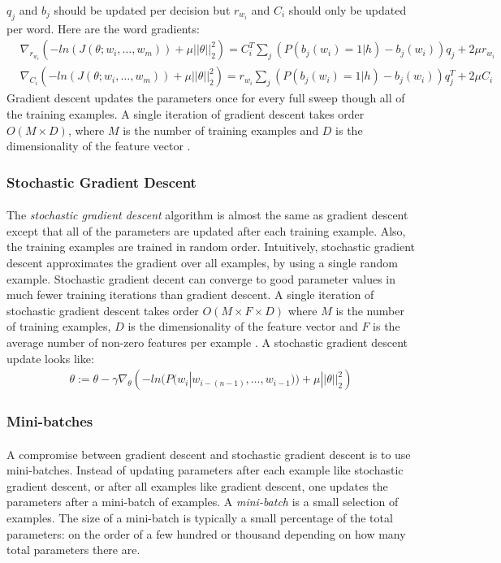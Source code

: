 $q_j$ and $b_j$ should be updated per decision but $r_{w_i}$ and $C_i$ should only be updated per word. Here are the word gradients:
\begin{align}
& \nabla_{r_{w_i}} \left( -ln(J(\theta;w_i,\dots, w_m)) +  \mu ||\theta||^2_2 \right)  =  C_i^T \sum_j \left( P \left(b_j(w_i) = 1 | h \right)  - b_j(w_i) \right)q_j +2\mu r_{w_i} \nonumber
\\
& \nabla_{C_i} \left( -ln(J(\theta;w_i,\dots, w_m)) +  \mu ||\theta||^2_2 \right)  =  r_{w_i} \sum_j \left( P \left(b_j(w_i) = 1 | h \right) - b_j(w_i) \right) q_j^T  +2\mu C_i
\end{align}
Gradient descent updates the parameters once for every full sweep though all of the training examples. A single iteration of gradient descent takes order $O(M\times D)$, where $M$ is the number of training examples and $D$ is the dimensionality of the feature vector \cite{Elkan2013}. 

\subsubsection{Stochastic Gradient Descent}
\paragraph{}
The \emph{stochastic gradient descent} algorithm is almost the same as gradient descent except that all of the parameters are updated after each training example. Also, the training examples are trained in random order. Intuitively, stochastic gradient descent approximates the gradient over all examples, by using a single random example. Stochastic gradient decent can converge to good parameter values in much fewer training iterations than gradient descent. A single iteration of stochastic gradient descent takes order $O(M\times F \times D)$ where $M$ is the number of training examples, $D$ is the dimensionality of the feature vector and $F$ is the average number of non-zero features per example \cite{Elkan2013}. 
A stochastic gradient descent update looks like:
\begin{align}
\theta := \theta - \gamma \nabla_\theta \left( -ln(P(w_i | w_{i-(n-1)},\dots, w_{i-1})) +  \mu ||\theta||^2_2 \right)
\end{align}
\subsubsection{Mini-batches}
\paragraph{}
A compromise between gradient descent and stochastic gradient descent is to use mini-batches. Instead of updating parameters after each example like stochastic gradient descent, or after all examples like gradient descent, one updates the parameters after a mini-batch of examples. A \emph{mini-batch} is a small selection of examples. The size of a mini-batch is typically a small percentage of the total parameters: on the order of a few hundred or thousand depending on how many total parameters there are.



